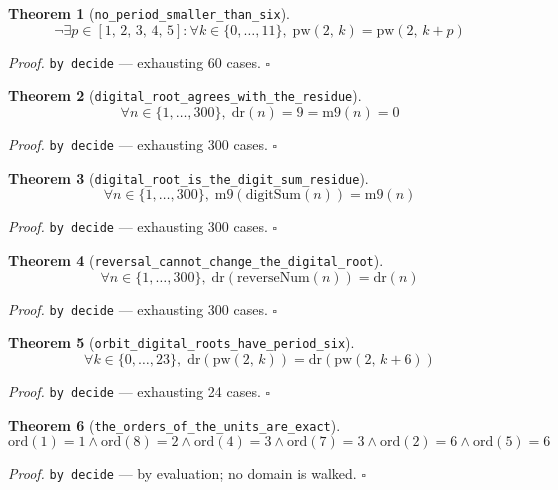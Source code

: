 \documentclass[11pt]{article}
\newtheorem{theorem}{Theorem}[section]
\begin{document}
\begin{theorem}[\texttt{no\_period\_smaller\_than\_six}]
\[ \lnot \exists p \in [1,\,2,\,3,\,4,\,5] : \forall k \in \{0,\dots,11\},\; \mathrm{pw}\mathopen{}\left(2,\,k\right) = \mathrm{pw}\mathopen{}\left(2,\,k + p\right) \]
\end{theorem}
\noindent\emph{Proof.} \texttt{by decide} --- exhausting 60 cases. \hfill$\square$

\begin{theorem}[\texttt{digital\_root\_agrees\_with\_the\_residue}]
\[ \forall n \in \{1,\dots,300\},\; \mathrm{dr}\mathopen{}\left(n\right) = 9 = \mathrm{m9}\mathopen{}\left(n\right) = 0 \]
\end{theorem}
\noindent\emph{Proof.} \texttt{by decide} --- exhausting 300 cases. \hfill$\square$

\begin{theorem}[\texttt{digital\_root\_is\_the\_digit\_sum\_residue}]
\[ \forall n \in \{1,\dots,300\},\; \mathrm{m9}\mathopen{}\left(\mathrm{digitSum}\mathopen{}\left(n\right)\right) = \mathrm{m9}\mathopen{}\left(n\right) \]
\end{theorem}
\noindent\emph{Proof.} \texttt{by decide} --- exhausting 300 cases. \hfill$\square$

\begin{theorem}[\texttt{reversal\_cannot\_change\_the\_digital\_root}]
\[ \forall n \in \{1,\dots,300\},\; \mathrm{dr}\mathopen{}\left(\mathrm{reverseNum}\mathopen{}\left(n\right)\right) = \mathrm{dr}\mathopen{}\left(n\right) \]
\end{theorem}
\noindent\emph{Proof.} \texttt{by decide} --- exhausting 300 cases. \hfill$\square$

\begin{theorem}[\texttt{orbit\_digital\_roots\_have\_period\_six}]
\[ \forall k \in \{0,\dots,23\},\; \mathrm{dr}\mathopen{}\left(\mathrm{pw}\mathopen{}\left(2,\,k\right)\right) = \mathrm{dr}\mathopen{}\left(\mathrm{pw}\mathopen{}\left(2,\,k + 6\right)\right) \]
\end{theorem}
\noindent\emph{Proof.} \texttt{by decide} --- exhausting 24 cases. \hfill$\square$

\begin{theorem}[\texttt{the\_orders\_of\_the\_units\_are\_exact}]
\[ \mathrm{ord}\mathopen{}\left(1\right) = 1 \land \mathrm{ord}\mathopen{}\left(8\right) = 2 \land \mathrm{ord}\mathopen{}\left(4\right) = 3 \land \mathrm{ord}\mathopen{}\left(7\right) = 3 \land \mathrm{ord}\mathopen{}\left(2\right) = 6 \land \mathrm{ord}\mathopen{}\left(5\right) = 6 \]
\end{theorem}
\noindent\emph{Proof.} \texttt{by decide} --- by evaluation; no domain is walked. \hfill$\square$
\end{document}
